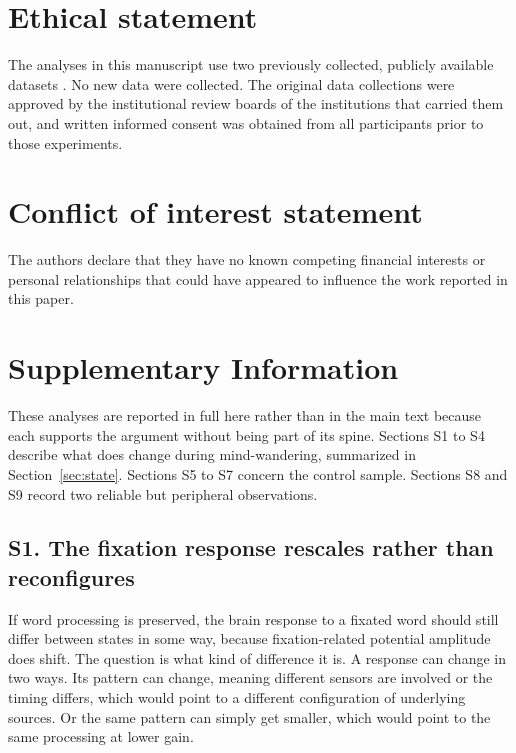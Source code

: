 \documentclass[11pt]{article}
\begin{document}
\section*{Ethical statement}

The analyses in this manuscript use two previously collected, publicly available datasets
\citep{roammdata,hollenstein2018}. No new data were collected. The original data collections
were approved by the institutional review boards of the institutions that carried them out, and
written informed consent was obtained from all participants prior to those experiments.

\section*{Conflict of interest statement}

The authors declare that they have no known competing financial interests or personal
relationships that could have appeared to influence the work reported in this paper.



\clearpage
\setcounter{figure}{0}
\renewcommand{\thefigure}{S\arabic{figure}}
\section*{Supplementary Information}

These analyses are reported in full here rather than in the main text because each
supports the argument without being part of its spine. Sections S1 to S4 describe what
does change during mind-wandering, summarized in Section~\ref{sec:state}. Sections S5 to
S7 concern the control sample. Sections S8 and S9 record two reliable but peripheral
observations.

\subsection*{S1. The fixation response rescales rather than reconfigures}

If word processing is preserved, the brain response to a fixated word should still differ
between states in some way, because fixation-related potential amplitude does shift. The
question is what kind of difference it is. A response can change in two ways. Its pattern can
change, meaning different sensors are involved or the timing differs, which would point to a
different configuration of underlying sources. Or the same pattern can simply get smaller,
which would point to the same processing at lower gain.
\end{document}
